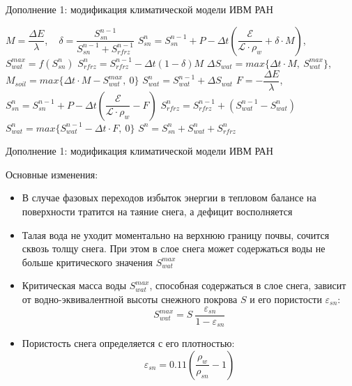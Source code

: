 \documentclass[unicode]{beamer}
\begin{document}
\begin{frame}{Дополнение 1: модификация климатической модели ИВМ РАН}

\tiny

        \State $ M = \dfrac{\Delta E}{\lambda} $, ~ $ \delta = \dfrac{S_{sn}^{n-1}}{S_{sn}^{n-1} + S_{rfrz}^{n - 1}}$ 
        \State $ S_{sn}^n = S_{sn}^{n-1} + P - \Delta t \left( \dfrac{\mathcal{E}}{\mathcal{L} \cdot \rho_w} + \delta \cdot M \right) $, ~  $ S_{wat}^{max} = f( S_{sn}^n ) $
        \State $ S_{rfrz}^n = S_{rfrz}^{n - 1} - \Delta t (1 - \delta)M $ 
        \State $ \Delta S_{wat} = max\{\Delta t \cdot M, ~S_{wat}^{max}\} $, ~ $ M_{soil} = max\{\Delta t \cdot M - S_{wat}^{max}, ~0\} $ 
        \State $ S_{wat}^n = S_{wat}^{n-1} + \Delta S_{wat} $ 
    \Else
            \State $F = -\dfrac{\Delta E}{\lambda}$, ~ $S_{sn}^n = S_{sn}^{n-1} + P - \Delta t \left( \dfrac{\mathcal{E}}{\mathcal{L} \cdot \rho_w} - F \right)$
            \State $S_{rfrz}^n = S_{rfrz}^{n - 1} + ( S_{wat}^{n-1} - S_{wat}^n )$
            \State $S_{wat}^n = max\{ S_{wat}^{n-1} - \Delta t \cdot F, ~0\}$
        \EndIf
    \EndIf
    \State $S^n = S_{sn}^n + S_{wat}^n + S_{rfrz}^n$

\end{frame}



\begin{frame}{Дополнение 1: модификация климатической модели ИВМ РАН}

\footnotesize
Основные изменения:

\begin{itemize}
    \item  В случае фазовых переходов избыток энергии в тепловом балансе на поверхности тратится на таяние снега, а дефицит восполняется 
    \item  Талая вода не уходит моментально на верхнюю границу почвы, сочится сквозь толщу снега. При этом в слое снега может содержаться воды не больше критического значения $S_{wat}^{max}$
    \item Критическая масса воды $S_{wat}^{max}$, способная содержаться в слое снега, зависит от водно-эквивалентной высоты снежного покрова $S$ и его пористости $\varepsilon_{sn}$:
    \[ S_{wat}^{max} = S ~\dfrac{\varepsilon_{sn}}{1 - \varepsilon_{sn}} \]
    \item Пористость снега определяется с его плотностью:
    \[ \varepsilon_{sn} = 0.11 \left( \dfrac{\rho_w}{\rho_{sn}} - 1 \right) \]

\end{itemize}

\end{frame}
\end{document}
